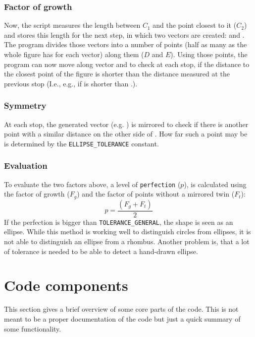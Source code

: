 \documentclass[12pt, a4paper]{article}
\begin{document}
            \subsubsection*{Factor of growth}
                Now, the script measures the length between $C_1$ and the point closest to it ($C_2$) and stores this length for the next step, in which two vectors are created:  and . The program divides those vectors into a number of points (half as many as the whole figure has for each vector) along them ($D$ and $E$). Using those points, the program can now move along vector  and  to check at each stop, if the distance to the closest point of the figure is shorter than the distance measured at the previous stop (I.e., e.g., if  is shorter than .). 

            \subsubsection*{Symmetry}
                At each stop, the generated vector (e.g. ) is mirrored to check if there is another point with a similar distance on the other side of . How far such a point may be is determined by the \texttt{ELLIPSE\_TOLERANCE} constant.

            \subsubsection*{Evaluation}
                To evaluate the two factors above, a level of \texttt{perfection} ($p$), is calculated using the factor of growth ($F_g$) and the factor of points without a mirrored twin ($F_t$): $$p=\frac{(F_g + F_t)}{2}$$ If the perfection is bigger than \texttt{TOLERANCE\_GENERAL}, the shape is seen as an ellipse. While this method is working well to distinguish circles from ellipses, it is not able to distinguish an ellipse from a rhombus. Another problem is, that a lot of tolerance is needed to be able to detect a hand-drawn ellipse.

    \section{Code components}
        This section gives a brief overview of some core parts of the code. This is not meant to be a proper documentation of the code but just a quick summary of some functionality.
\end{document}
